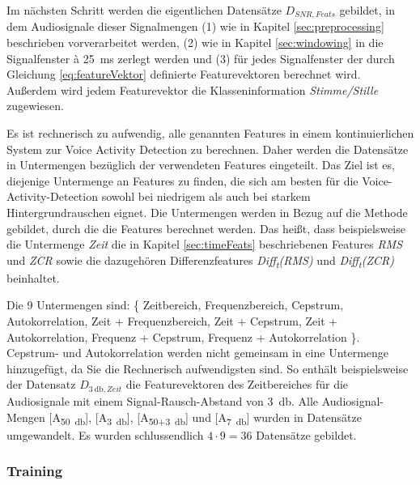 Im nächsten Schritt werden die eigentlichen Datensätze $D_{SNR,Feats}$ gebildet, in dem Audiosignale dieser Signalmengen (1) wie in Kapitel \ref{sec:preprocessing} beschrieben vorverarbeitet werden, (2) wie in Kapitel \ref{sec:windowing} in die Signalfenster à \SI{25}{\milli\second} zerlegt werden und (3) für jedes Signalfenster der durch Gleichung \ref{eq:featureVektor} definierte Featurevektoren berechnet wird. Außerdem wird jedem Featurevektor die Klasseninformation \emph{Stimme/Stille} zugewiesen.

Es ist rechnerisch zu aufwendig, alle genannten Features in einem kontinuierlichen System zur Voice Activity Detection zu berechnen. Daher werden die Datensätze in Untermengen bezüglich der verwendeten Features eingeteilt. Das Ziel ist es, diejenige Untermenge an Features zu finden, die sich am besten für die Voice-Activity-Detection sowohl bei niedrigem als auch bei starkem Hintergrundrauschen eignet. Die Untermengen werden in Bezug auf die Methode gebildet, durch die die Features berechnet werden. Das heißt, dass beispielsweise die Untermenge \emph{Zeit} die in Kapitel \ref{sec:timeFeats} beschriebenen Features \emph{RMS} und \emph{ZCR} sowie die dazugehören Differenzfeatures \emph{Diff\textsubscript{t}(RMS)} und \emph{Diff\textsubscript{t}(ZCR)} beinhaltet. 

Die 9 Untermengen sind: \{ Zeitbereich, Frequenzbereich, Cepstrum, Autokorrelation, Zeit + Frequenzbereich, Zeit + Cepstrum, Zeit + Autokorrelation, Frequenz + Cepstrum, Frequenz + Autokorrelation \}. Cepstrum- und Autokorrelation werden nicht gemeinsam in eine Untermenge hinzugefügt, da Sie die Rechnerisch aufwendigsten sind. So enthält beispielsweise der Datensatz $D_{\SI{3}{\decibel},Zeit}$ die Featurevektoren des Zeitbereiches für die Audiosignale mit einem Signal-Rausch-Abstand von \SI{3}{\decibel}. Alle Audiosignal-Mengen [A\textsubscript{\SI{50}{\decibel}}], [A\textsubscript{\SI{3}{\decibel}}], [A\textsubscript{50+\SI{3}{\decibel}}] und [A\textsubscript{\SI{7}{\decibel}}] wurden in Datensätze umgewandelt. Es wurden schlussendlich $4 \cdot 9 = 36$ Datensätze gebildet.

\subsubsection{Training} 
\label{sec:training}

